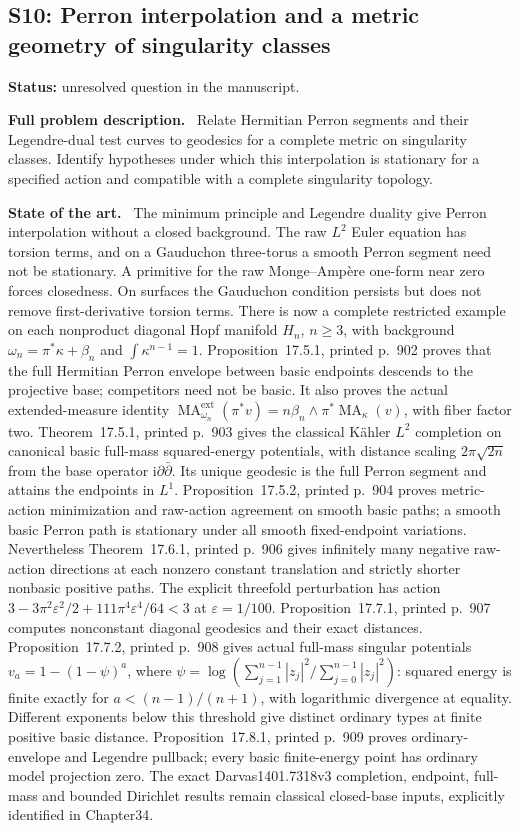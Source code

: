\documentclass[11pt]{article}
\newcommand{\field}[1]{\par\medskip\noindent\textbf{#1.}\ }
\begin{document}
\subsection{S10: Perron interpolation and a metric geometry of singularity classes}
\label{S10}
\noindent\textbf{Status:} unresolved question in the manuscript.
\field{Full problem description} Relate Hermitian Perron segments and their Legendre-dual test curves to geodesics for a complete metric on singularity classes. Identify hypotheses under which this interpolation is stationary for a specified action and compatible with a complete singularity topology.
\field{State of the art} The minimum principle and Legendre duality give Perron interpolation without a closed background. The raw $L^2$ Euler equation has torsion terms, and on a Gauduchon three-torus a smooth Perron segment need not be stationary. A primitive for the raw Monge--Amp\`ere one-form near zero forces closedness. On surfaces the Gauduchon condition persists but does not remove first-derivative torsion terms. There is now a complete restricted example on each nonproduct diagonal Hopf manifold $H_n$, $n\geq3$, with background $\omega_n=\pi^*\kappa+\beta_n$ and $\int\kappa^{n-1}=1$. Proposition~17.5.1, printed p.~902 proves that the full Hermitian Perron envelope between basic endpoints descends to the projective base; competitors need not be basic. It also proves the actual extended-measure identity $\operatorname{MA}^{\mathrm{ext}}_{\omega_n}(\pi^*v)=n\beta_n\wedge\pi^*\operatorname{MA}_\kappa(v)$, with fiber factor two. Theorem~17.5.1, printed p.~903 gives the classical K\"ahler $L^2$ completion on canonical basic full-mass squared-energy potentials, with distance scaling $2\pi\sqrt{2n}$ from the base operator $\mathrm i\partial\bar\partial$. Its unique geodesic is the full Perron segment and attains the endpoints in $L^1$. Proposition~17.5.2, printed p.~904 proves metric-action minimization and raw-action agreement on smooth basic paths; a smooth basic Perron path is stationary under all smooth fixed-endpoint variations. Nevertheless Theorem~17.6.1, printed p.~906 gives infinitely many negative raw-action directions at each nonzero constant translation and strictly shorter nonbasic positive paths. The explicit threefold perturbation has action $3-3\pi^2\varepsilon^2/2+111\pi^4\varepsilon^4/64<3$ at $\varepsilon=1/100$. Proposition~17.7.1, printed p.~907 computes nonconstant diagonal geodesics and their exact distances. Proposition~17.7.2, printed p.~908 gives actual full-mass singular potentials $v_a=1-(1-\psi)^a$, where $\psi=\log(\sum_{j=1}^{n-1}|z_j|^2/\sum_{j=0}^{n-1}|z_j|^2)$: squared energy is finite exactly for $a<(n-1)/(n+1)$, with logarithmic divergence at equality. Different exponents below this threshold give distinct ordinary types at finite positive basic distance. Proposition~17.8.1, printed p.~909 proves ordinary-envelope and Legendre pullback; every basic finite-energy point has ordinary model projection zero. The exact Darvas1401.7318v3 completion, endpoint, full-mass and bounded Dirichlet results remain classical closed-base inputs, explicitly identified in Chapter34.
\end{document}
